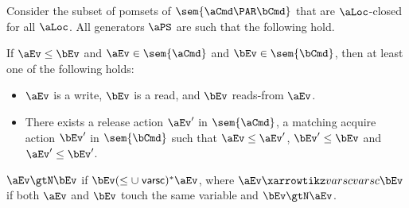 \begin{lemma}
Consider the subset of pomsets of $\sem{\aCmd \PAR \bCmd}$ that are  $\aLoc$-closed for all $\aLoc$.  
All generators $\aPS$   are such that the following hold.

If $\aEv\le\bEv$ and $\aEv \in \sem{\aCmd}$ and  $\bEv \in \sem{\bCmd}$, then at least one of the following holds:
\begin{itemize}
\item  $\aEv$ is a write, $\bEv$ is a read, and $\bEv$ reads-from $\aEv$.
\item There exists a release action $\aEv'$ in $\sem{\aCmd}$, a matching acquire action $\bEv'$ in $\sem{\bCmd}$ such that $\aEv \le \aEv'$, $\bEv' \le \bEv$ and $\aEv' \le \bEv'$.
\end{itemize}

$\aEv \gtN \bEv$ if $ \bEv (\le \cup \rvarsc)^* \aEv$, where
            $ \aEv \xvarsc  \bEv$ if both $\aEv$ and $\bEv$ touch the same variable and $\bEv \gtN \aEv$.

\end{lemma}

\endinput

\section{Generators for semantics of programs with parallel composition}






\begin{definition}
$ \aEv \xvarsc  \bEv$ if both $\aEv$ and $\bEv$ touch the same variable and $\aEv \xird \bEv$ or $\aEv \xrb \bEv$ or $\aEv\xird \bEv$ or $\bEv \gtN \aev$.
\end{definition}

